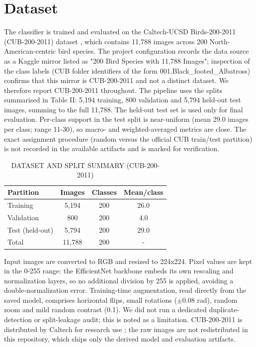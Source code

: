 \documentclass[conference]{IEEEtran}
\begin{document}
\section{Dataset}
The classifier is trained and evaluated on the Caltech-UCSD Birds-200-2011 (CUB-200-2011) dataset \cite{ref6}, which contains 11,788 images across 200 North-American-centric bird species. The project configuration records the data source as a Kaggle mirror listed as "200 Bird Species with 11,788 Images"; inspection of the class labels (CUB folder identifiers of the form 001.Black\_footed\_Albatross) confirms that this mirror is CUB-200-2011 and not a distinct dataset. We therefore report CUB-200-2011 throughout.
The pipeline uses the splits summarised in Table II: 5,194 training, 800 validation and 5,794 held-out test images, summing to the full 11,788. The held-out test set is used only for final evaluation. Per-class support in the test split is near-uniform (mean 29.0 images per class; range 11-30), so macro- and weighted-averaged metrics are close. The exact assignment procedure (random versus the official CUB train/test partition) is not recorded in the available artifacts and is marked for verification.
\begin{table}[t]
\centering
\caption{DATASET AND SPLIT SUMMARY (CUB-200-2011)}
\label{tab:II}
\footnotesize
\begin{tabular}{lccc}
\toprule
\textbf{Partition} & \textbf{Images} & \textbf{Classes} & \textbf{Mean/class} \\
\midrule
Training & 5,194 & 200 & 26.0 \\
Validation & 800 & 200 & 4.0 \\
Test (held-out) & 5,794 & 200 & 29.0 \\
Total & 11,788 & 200 & - \\
\bottomrule
\end{tabular}
\end{table}
Input images are converted to RGB and resized to 224x224. Pixel values are kept in the 0-255 range: the EfficientNet backbone embeds its own rescaling and normalization layers, so no additional division by 255 is applied, avoiding a double-normalization error. Training-time augmentation, read directly from the saved model, comprises horizontal flips, small rotations ($\pm$0.08 rad), random zoom and mild random contrast (0.1). We did not run a dedicated duplicate-detection or split-leakage audit; this is noted as a limitation. CUB-200-2011 is distributed by Caltech for research use \cite{ref6}; the raw images are not redistributed in this repository, which ships only the derived model and evaluation artifacts.
\end{document}
